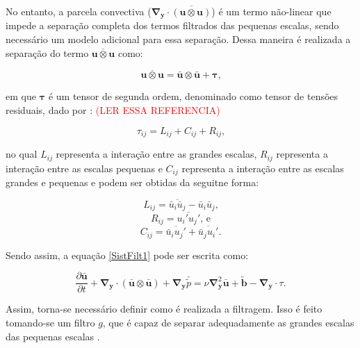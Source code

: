 \documentclass[_ArquivoPrincipal.tex]{subfiles}
\begin{document}
No entanto, a parcela convectiva ($\mathbf{\nabla}_\mathbf{y}\cdot\overline{(\mathbf{u}\otimes\mathbf{u})}$) é um termo não-linear que impede a separação completa dos termos filtrados das pequenas escalas, sendo necessário um modelo adicional para essa separação. Dessa maneira é realizada a separação do termo $\overline{\mathbf{u}\otimes\mathbf{u}}$ como:

\begin{equation}
    \overline{\mathbf{u}\otimes\mathbf{u}}=\bar{\mathbf{u}}\otimes\bar{\mathbf{u}}+\mathbf{\tau}\text{,}
    \label{Sep2}
\end{equation}

\noindent em que $\mathbf{\tau}$ é um tensor de segunda ordem, denominado como tensor de tensões residuais, dado por \cite{leonard1975energy}: \textcolor{red}{(LER ESSA REFERENCIA)}

\begin{equation}
    \tau_{ij}=L_{ij}+C_{ij}+R_{ij}\text{,}
    \label{TensRes}
\end{equation}

\noindent no qual $L_{ij}$ representa a interação entre as grandes escalas, $R_{ij}$ representa a interação entre as escalas pequenas e $C_{ij}$ representa a interação entre as escalas grandes e pequenas e podem ser obtidas da seguitne forma:

\begin{equation}
    L_{ij}=\overline{\bar{u}_i\bar{u}_j}-\bar{u}_i\bar{u}_j\text{,}
    \label{Lij}
\end{equation}
\begin{equation}
    R_{ij}=\overline{u_i'u_j'}\text{, e}
    \label{Cij}
\end{equation}
\begin{equation}
    C_{ij}=\overline{\bar{u}_iu_j'}+\overline{\bar{u}_ju_i'}\text{.}
    \label{Rij}
\end{equation}

Sendo assim, a equação \ref{SistFilt1} pode ser escrita como:

\begin{equation}
    \frac{\partial\bar{\mathbf{u}}}{\partial t}+\mathbf{\nabla}_\mathbf{y}\cdot{(\bar{\mathbf{u}}\otimes\bar{\mathbf{u}})}+\mathbf{\nabla}_\mathbf{y}\bar{\tilde{p}}=\nu\mathbf{\nabla}^2_\mathbf{y}\bar{\mathbf{u}}+\tilde{\mathbf{b}}-\mathbf{\nabla}_\mathbf{y}\cdot\tau\text{.}
    \label{EqFiltrada}
\end{equation}

Assim, torna-se necessário definir como é realizada a filtragem. Isso é feito tomando-se um filtro $g$, que é capaz de separar adequadamente as grandes escalas das pequenas escalas \cite{hughes2000large}.
\end{document}
